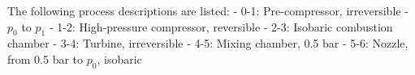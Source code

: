 The following process descriptions are listed:  
- 0-1: Pre-compressor, irreversible  
- \( p_0 \) to \( p_1 \)  
- 1-2: High-pressure compressor, reversible  
- 2-3: Isobaric combustion chamber  
- 3-4: Turbine, irreversible  
- 4-5: Mixing chamber, 0.5 bar  
- 5-6: Nozzle, from 0.5 bar to \( p_0 \), isobaric